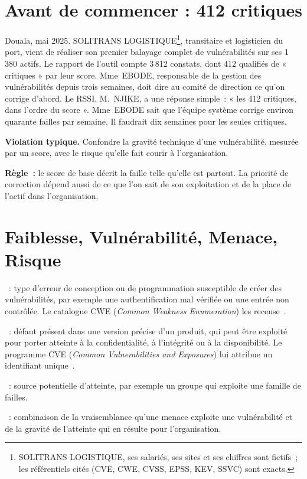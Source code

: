 \section*{Avant de commencer : 412 critiques}

Douala, mai 2025. SOLITRANS LOGISTIQUE\footnote{SOLITRANS LOGISTIQUE, ses
salariés, ses sites et ses chiffres sont fictifs~; les référentiels cités
(CVE, CWE, CVSS, EPSS, KEV, SSVC) sont exacts.}, transitaire et
logisticien du port, vient de réaliser son premier balayage complet de
vulnérabilités sur ses 1\,380 actifs. Le rapport de l'outil compte 3\,812
constats, dont 412 qualifiés de « critiques » par leur score. Mme~EBODE,
responsable de la gestion des vulnérabilités depuis trois semaines, doit
dire au comité de direction ce qu'on corrige d'abord. Le RSSI, M.~NJIKE, a
une réponse simple~: « les 412 critiques, dans l'ordre du score ». Mme~EBODE
sait que l'équipe système corrige environ quarante failles par semaine. Il
faudrait dix semaines pour les seules critiques.

\begin{boxalert}
\textbf{Violation typique.} Confondre la gravité technique d'une
vulnérabilité, mesurée par un score, avec le risque qu'elle fait courir à
l'organisation.

\smallskip
\textbf{Règle~:} le score de base décrit la faille telle qu'elle est partout.
La priorité de correction dépend aussi de ce que l'on sait de son
exploitation et de la place de l'actif dans l'organisation.
\end{boxalert}

\separateur

\section{Faiblesse, Vulnérabilité, Menace, Risque}
\label{sec:c09-definitions}

\begin{boxdef}
\textbf{}~: type d'erreur de conception ou de
programmation susceptible de créer des vulnérabilités, par exemple une
authentification mal vérifiée ou une entrée non contrôlée. Le catalogue CWE
(\textit{Common Weakness Enumeration}) les recense~\cite{mitrecwe}.

\smallskip
\textbf{}~: défaut présent dans une version précise
d'un produit, qui peut être exploité pour porter atteinte à la
confidentialité, à l'intégrité ou à la disponibilité. Le programme CVE
(\textit{Common Vulnerabilities and Exposures}) lui attribue un identifiant
unique~\cite{mitrecve}.

\smallskip
\textbf{}~: source potentielle d'atteinte, par exemple un
groupe qui exploite une famille de failles.

\smallskip
\textbf{}~: combinaison de la vraisemblance qu'une menace
exploite une vulnérabilité et de la gravité de l'atteinte qui en résulte
pour l'organisation.
\end{boxdef}

